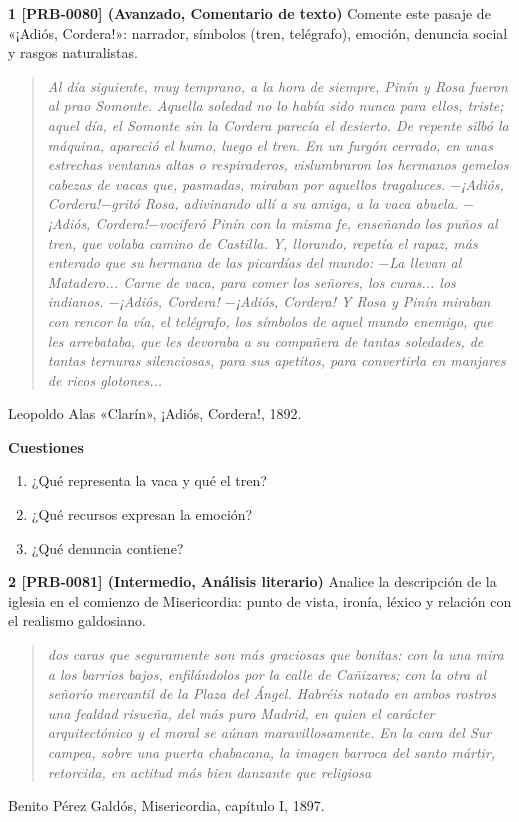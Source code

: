\documentclass{book}
\begin{document}
\begin{tcolorbox}[title={Ejercicios}, studiumworked, breakable]

\noindent\textbf{1 [PRB-0080] (Avanzado, Comentario de texto)}
Comente este pasaje de «¡Adiós, Cordera!»: narrador, símbolos (tren, telégrafo), emoción, denuncia social y rasgos naturalistas.


\begin{quote}
\itshape Al día siguiente, muy temprano, a la hora de siempre, Pinín y Rosa fueron al prao Somonte. Aquella soledad no lo había sido nunca para ellos, triste; aquel día, el Somonte sin la Cordera parecía el desierto. De repente silbó la máquina, apareció el humo, luego el tren. En un furgón cerrado, en unas estrechas ventanas altas o respiraderos, vislumbraron los hermanos gemelos cabezas de vacas que, pasmadas, miraban por aquellos tragaluces. \(-\)¡Adiós, Cordera!\(-\)gritó Rosa, adivinando allí a su amiga, a la vaca abuela. \(-\)¡Adiós, Cordera!\(-\)vociferó Pinín con la misma fe, enseñando los puños al tren, que volaba camino de Castilla. Y, llorando, repetía el rapaz, más enterado que su hermana de las picardías del mundo: \(-\)La llevan al Matadero... Carne de vaca, para comer los señores, los curas... los indianos. \(-\)¡Adiós, Cordera! \(-\)¡Adiós, Cordera! Y Rosa y Pinín miraban con rencor la vía, el telégrafo, los símbolos de aquel mundo enemigo, que les arrebataba, que les devoraba a su compañera de tantas soledades, de tantas ternuras silenciosas, para sus apetitos, para convertirla en manjares de ricos glotones...
\end{quote}
{\noindent\footnotesize Leopoldo Alas «Clarín», ¡Adiós, Cordera!, 1892.\par}

\noindent\textbf{Cuestiones}
\begin{enumerate}
\item ¿Qué representa la vaca y qué el tren?
\item ¿Qué recursos expresan la emoción?
\item ¿Qué denuncia contiene?
\end{enumerate}

\noindent\textbf{2 [PRB-0081] (Intermedio, Análisis literario)}
Analice la descripción de la iglesia en el comienzo de Misericordia: punto de vista, ironía, léxico y relación con el realismo galdosiano.


\begin{quote}
\itshape dos caras que seguramente son más graciosas que bonitas: con la una mira a los barrios bajos, enfilándolos por la calle de Cañizares; con la otra al señorío mercantil de la Plaza del Ángel. Habréis notado en ambos rostros una fealdad risueña, del más puro Madrid, en quien el carácter arquitectónico y el moral se aúnan maravillosamente. En la cara del Sur campea, sobre una puerta chabacana, la imagen barroca del santo mártir, retorcida, en actitud más bien danzante que religiosa
\end{quote}
{\noindent\footnotesize Benito Pérez Galdós, Misericordia, capítulo I, 1897.\par}


\end{tcolorbox}
\end{document}
